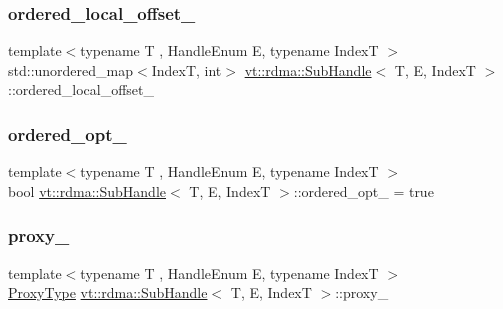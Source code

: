 \mbox{\label{structvt_1_1rdma_1_1_sub_handle_a384d5a4c7b19a6bfd9546769d7da1e85}} 
\subsubsection{\texorpdfstring{ordered\+\_\+local\+\_\+offset\+\_\+}{ordered\_local\_offset\_}}
{\footnotesize\ttfamily template$<$typename T , Handle\+Enum E, typename IndexT $>$ \\
std\+::unordered\+\_\+map$<$IndexT, int$>$ \hyperlink{structvt_1_1rdma_1_1_sub_handle}{vt\+::rdma\+::\+Sub\+Handle}$<$ T, E, IndexT $>$\+::ordered\+\_\+local\+\_\+offset\+\_\+\hspace{0.3cm}{\ttfamily [protected]}}

\mbox{\label{structvt_1_1rdma_1_1_sub_handle_a3675b46b618cd10df2ba80df3c084717}} 
\subsubsection{\texorpdfstring{ordered\+\_\+opt\+\_\+}{ordered\_opt\_}}
{\footnotesize\ttfamily template$<$typename T , Handle\+Enum E, typename IndexT $>$ \\
bool \hyperlink{structvt_1_1rdma_1_1_sub_handle}{vt\+::rdma\+::\+Sub\+Handle}$<$ T, E, IndexT $>$\+::ordered\+\_\+opt\+\_\+ = true\hspace{0.3cm}{\ttfamily [protected]}}

\mbox{\label{structvt_1_1rdma_1_1_sub_handle_a10a5a6554a57910351679c93432af59e}} 
\subsubsection{\texorpdfstring{proxy\+\_\+}{proxy\_}}
{\footnotesize\ttfamily template$<$typename T , Handle\+Enum E, typename IndexT $>$ \\
\hyperlink{structvt_1_1rdma_1_1_sub_handle_a758bee2e499658cfef92ace83eea6590}{Proxy\+Type} \hyperlink{structvt_1_1rdma_1_1_sub_handle}{vt\+::rdma\+::\+Sub\+Handle}$<$ T, E, IndexT $>$\+::proxy\+\_\+\hspace{0.3cm}{\ttfamily [protected]}}

